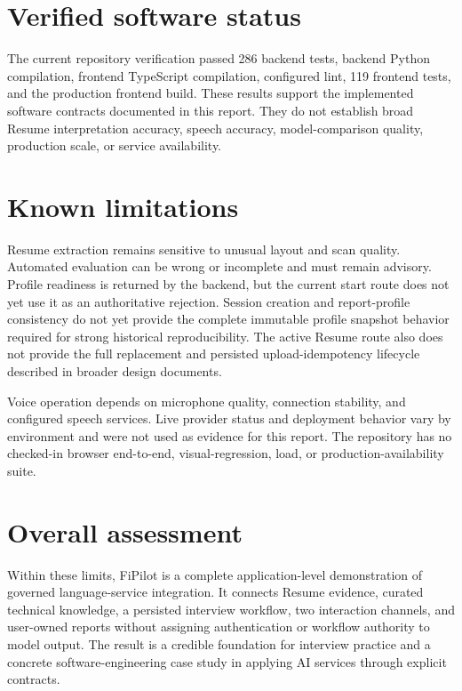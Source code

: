 \section{Verified software status}

The current repository verification passed 286 backend tests, backend Python compilation, frontend TypeScript compilation, configured lint, 119 frontend tests, and the production frontend build. These results support the implemented software contracts documented in this report. They do not establish broad Resume interpretation accuracy, speech accuracy, model-comparison quality, production scale, or service availability.

\section{Known limitations}

Resume extraction remains sensitive to unusual layout and scan quality. Automated evaluation can be wrong or incomplete and must remain advisory. Profile readiness is returned by the backend, but the current start route does not yet use it as an authoritative rejection. Session creation and report-profile consistency do not yet provide the complete immutable profile snapshot behavior required for strong historical reproducibility. The active Resume route also does not provide the full replacement and persisted upload-idempotency lifecycle described in broader design documents.

Voice operation depends on microphone quality, connection stability, and configured speech services. Live provider status and deployment behavior vary by environment and were not used as evidence for this report. The repository has no checked-in browser end-to-end, visual-regression, load, or production-availability suite.

\section{Overall assessment}

Within these limits, FiPilot is a complete application-level demonstration of governed language-service integration. It connects Resume evidence, curated technical knowledge, a persisted interview workflow, two interaction channels, and user-owned reports without assigning authentication or workflow authority to model output. The result is a credible foundation for interview practice and a concrete software-engineering case study in applying AI services through explicit contracts.

